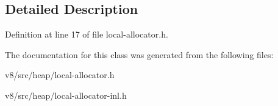 \subsection{Detailed Description}


Definition at line 17 of file local-\/allocator.\+h.



The documentation for this class was generated from the following files\+:\begin{DoxyCompactItemize}
\item 
v8/src/heap/local-\/allocator.\+h\item 
v8/src/heap/local-\/allocator-\/inl.\+h\end{DoxyCompactItemize}
